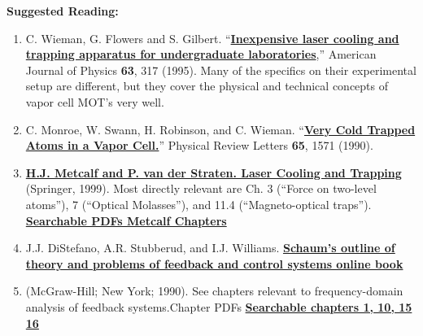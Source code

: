 \documentclass{../lab}
\begin{document}
\textbf{Suggested Reading:}

\begin{enumerate}
    \item C. Wieman, G. Flowers and S. Gilbert. ``\href{http://physics111.lib.berkeley.edu/Physics111/Reprints/MOT/MOT\_Plans.pdf}{\textbf{Inexpensive laser cooling and trapping apparatus for undergraduate laboratories}},'' American Journal of Physics \textbf{63}, 317 (1995). Many of the specifics on their experimental setup are different, but they cover the physical and technical concepts of vapor cell MOT's very well.

    \item C. Monroe, W. Swann, H. Robinson, and C. Wieman. ``\href{http://physics111.lib.berkeley.edu/Physics111/Reprints/MOT/Very\%20Cold\%20Trapped\%20Atoms\%20in\%20a\%20Vapor\%20Cell_PhysRevLett.65.1571.pdf}{\textbf{Very Cold Trapped Atoms in a Vapor Cell.}}'' Physical Review Letters \textbf{65}, 1571 (1990). 

    \item \href{http://books.google.com/books?id=hDJPnSFh-g0C&dq=H.J.+Metcalf+and+P.+van+der+Straeten.+Laser+Cooling+and+Trapping+book&printsec=frontcover&source=bn&hl=en&ei=jMWaS4eRD4TuswPgytidAg&sa=X&oi=book\_result&ct=result&resnum=4&ved=0CBAQ6AEwAw#v=onepage&q=&f=false}{\textbf{H.J. Metcalf and P. van der Straten. Laser Cooling and Trapping}} (Springer, 1999). Most directly relevant are Ch. 3 (``Force on two-level atoms''), 7 (``Optical Molasses''), and 11.4 (``Magneto-optical traps''). \href{http://physics111.lib.berkeley.edu/Physics111/Reprints/MOT/Laser\_Cooling\_and\_Trapping\_HJ\_Metcalf/}{\textbf{Searchable PDFs Metcalf Chapters}}

    \item J.J. DiStefano, A.R. Stubberud, and I.J. Williams. \href{http://physics111.lib.berkeley.edu/Physics111/Reprints/MOT/Schaum's\%20Outline\%20Theory\%20and\%20Problems\%20of\%20Feedback\%20and\%20Control\%20Systems/}{\textbf{Schaum’s outline of theory and problems of feedback and control systems online book}}

    \item (McGraw-Hill; New York; 1990). See chapters relevant to frequency-domain analysis of feedback systems.Chapter PDFs \href{http://physics111.lib.berkeley.edu/Physics111/Reprints/MOT/Schaum's\%20Outline\%20Theory\%20and\%20Problems\%20of\%20Feedback\%20and\%20Control\%20Systems/}{\textbf{Searchable chapters 1, 10, 15 16}}
\end{enumerate}
\end{document}
